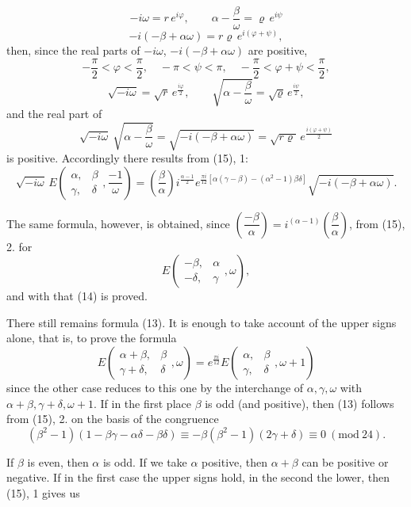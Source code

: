 \[
-i\omega = r\,e^{i\varphi}, \qquad \alpha-\frac{\beta}{\omega} = \varrho\,e^{i\psi}
\]
\[
-i(-\beta+\alpha\omega) = r\varrho\,e^{i(\varphi+\psi)},
\]
then, since the real parts of $-i\omega$, $-i(-\beta+\alpha\omega)$ are positive,
\[
-\frac{\pi}{2} < \varphi < \frac{\pi}{2}, \quad -\pi < \psi < \pi, \quad
-\frac{\pi}{2} < \varphi+\psi < \frac{\pi}{2},
\]
\[
\sqrt{-i\omega} = \sqrt{r}\,e^{\frac{i\varphi}{2}}, \qquad
\sqrt{\alpha-\frac{\beta}{\omega}} = \sqrt{\varrho}\,e^{\frac{i\psi}{2}},
\]
and the real part of
\[
\sqrt{-i\omega}\ \sqrt{\alpha-\frac{\beta}{\omega}} = \sqrt{-i(-\beta+\alpha\omega)}
= \sqrt{r\varrho}\,e^{\frac{i(\varphi+\psi)}{2}}
\]
is positive. Accordingly there results from (15), 1:
\[
\sqrt{-i\omega}\, E\!\left(\begin{matrix}\alpha, & \beta \\ \gamma, & \delta\end{matrix}, \frac{-1}{\omega}\right)
= \left(\frac{\beta}{\alpha}\right) i^{\frac{\alpha-1}{2}}
e^{\frac{\pi i}{12}\left[\alpha(\gamma-\beta)-(\alpha^2-1)\beta\delta\right]}
\sqrt{-i(-\beta+\alpha\omega)}.
\]

The same formula, however, is obtained, since $\left(\dfrac{-\beta}{\alpha}\right)=i^{(\alpha-1)}\left(\dfrac{\beta}{\alpha}\right)$,
from (15), 2. for
\[
E\!\left(\begin{matrix}-\beta, & \alpha \\ -\delta, & \gamma\end{matrix}, \omega\right),
\]
and with that (14) is proved.

There still remains formula (13). It is enough to take account of the
upper signs alone, that is, to prove the formula
\[
E\!\left(\begin{matrix}\alpha+\beta, & \beta \\ \gamma+\delta, & \delta\end{matrix}, \omega\right)
= e^{\frac{\pi i}{12}} E\!\left(\begin{matrix}\alpha, & \beta \\ \gamma, & \delta\end{matrix}, \omega+1\right)
\]
since the other case reduces to this one by the interchange of $\alpha, \gamma, \omega$
with $\alpha+\beta, \gamma+\delta, \omega+1$. If in the first place
$\beta$ is odd (and positive), then (13) follows from (15), 2. on the
basis of the congruence
\[
(\beta^2-1)(1-\beta\gamma-\alpha\delta-\beta\delta) \equiv -\beta(\beta^2-1)(2\gamma+\delta) \equiv 0\ (\mathrm{mod}\ 24).
\]

If $\beta$ is even, then $\alpha$ is odd. If we take $\alpha$ positive, then
$\alpha+\beta$ can be positive or negative. If in the first case the
upper signs hold, in the second the lower, then (15), 1 gives us
